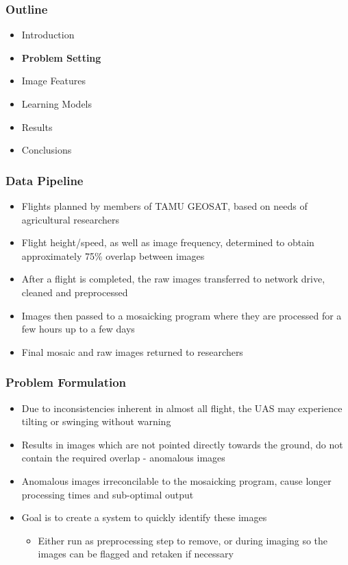 \documentclass{beamer}
\begin{document}
\begin{frame}
\frametitle{Outline}
\begin{itemize}
  \item Introduction
  \item\vspace{0.5cm} \textbf{Problem Setting}
  \item\vspace{0.5cm} Image Features
  \item \vspace{0.5cm}Learning Models
  \item \vspace{0.5cm} Results
  \item \vspace{0.5cm}Conclusions
\end{itemize}
\end{frame}


\begin{frame}
\frametitle{Data Pipeline}
\begin{itemize}
  \item Flights planned by members of TAMU GEOSAT, based on needs of agricultural researchers
  \item Flight height/speed, as well as image frequency, determined to obtain approximately 75\% overlap between images
  \item After a flight is completed, the raw images transferred to network drive, cleaned and preprocessed
  \item Images then passed to a mosaicking program where they are processed for a few hours up to a few days
  \item Final mosaic and raw images returned to researchers
\end{itemize}
\end{frame}


\begin{frame}
\frametitle{Problem Formulation}
\begin{itemize}
  \item Due to inconsistencies inherent in almost all flight, the UAS may experience tilting or swinging without warning
  \item Results in images which are not pointed directly towards the ground, do not contain the required overlap - anomalous images
  \item Anomalous images irreconcilable to the mosaicking program, cause longer processing times and sub-optimal output
  \item Goal is to create a system to quickly identify these images 
  \begin{itemize}
    \item Either run as preprocessing step to remove, or during imaging so the images can be flagged and retaken if necessary
  \end{itemize}
\end{itemize}
\end{frame}
\end{document}
